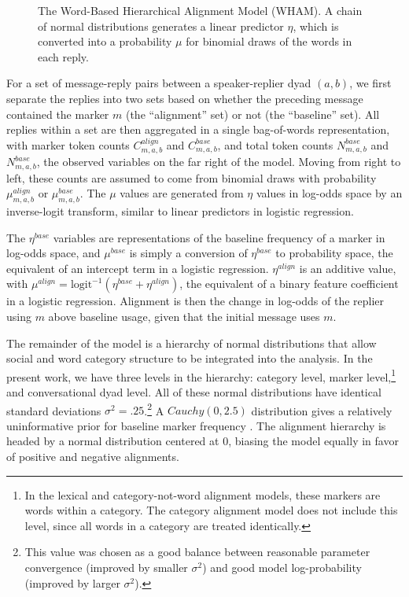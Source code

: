 \documentclass[11pt]{article}
\begin{document}
\begin{figure}[t]
  \begin{center}
    
  \end{center}
  \caption{The Word-Based Hierarchical Alignment Model (WHAM). A chain of normal distributions generates a linear predictor $\eta$, which is converted into a probability $\mu$ for binomial draws of the words in each reply.}\label{fig:wham}
\end{figure}

For a set of message-reply pairs between a speaker-replier dyad $(a,b)$, we first separate the replies into two sets based on whether the preceding message contained the marker $m$ (the ``alignment'' set) or not (the ``baseline'' set). All replies within a set are then aggregated in a single bag-of-words representation, with marker token counts $C^{align}_{m,a,b}$ and $C^{base}_{m,a,b}$, and total token counts $N^{base}_{m,a,b}$ and $N^{base}_{m,a,b}$, the observed variables on the far right of the model.  Moving from right to left, these counts are assumed to come from binomial draws with probability $\mu^{align}_{m,a,b}$ or $\mu^{base}_{m,a,b}$.  The $\mu$ values are generated from $\eta$ values in log-odds space by an inverse-logit transform, similar to linear predictors in logistic regression.

The $\eta^{base}$ variables are representations of the baseline frequency of a marker in log-odds space, and $\mu^{base}$ is simply a conversion of $\eta^{base}$ to probability space, the equivalent of an intercept term in a logistic regression. $\eta^{align}$ is an additive value, with $\mu^{align} = \textrm{logit}^{-1}(\eta^{base}+\eta^{align})$, the equivalent of a binary feature coefficient in a logistic regression.  Alignment is then the change in log-odds of the replier using $m$ above baseline usage, given that the initial message uses $m$.

The remainder of the model is a hierarchy of normal distributions that allow social and word category structure to be integrated into the analysis. In the present work, we have three levels in the hierarchy: category level, marker level,\footnote{In the lexical and category-not-word alignment models, these markers are words within a category. The category alignment model does not include this level, since all words in a category are treated identically.} and conversational dyad level. All of these normal distributions have identical standard deviations $\sigma^2=.25$.\footnote{This value was chosen as a good balance between reasonable parameter convergence (improved by smaller $\sigma^2$) and good model log-probability (improved by larger $\sigma^2$).}  A $Cauchy(0,2.5)$ distribution gives a relatively uninformative prior for baseline marker frequency \cite{GelmanEtAl2008}. The alignment hierarchy is headed by a normal distribution centered at 0, biasing the model equally in favor of positive and negative alignments.
\end{document}
